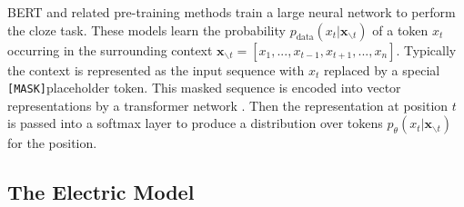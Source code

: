 \documentclass[11pt,a4paper]{article}
\newcommand{\kc}[1]{\textcolor{red}{KC: #1}}
\newcommand{\kc}[1]{}
\newcommand{\replace}[3] {
    \textsc{replace}(#1, #2, #3)
}
\newcommand{\aln}[1] {
	\begin{align} #1 \end{align}
}
\newcommand{\lossmle}{\mathcal{L}_{\text{MLE}}(\theta)}
\newcommand{\lossmlm}{\mathcal{L}_{\text{MLM}}(\theta)}
\newcommand{\I}{\bm{m}}
\newcommand{\bx}{\bm{x}}
\newcommand{\cntxt}{\bx_{\backslash t}}
\newcommand{\pdata}{p_\text{data}}
\newcommand{\E} {\mathop{\mathbb{E}}}
\newcommand{\mask}{\texttt{[MASK]}}
\begin{document}
BERT and related pre-training methods \cite{baevski2019cloze, liu2019roberta,  lan2019albert}
train a large neural network to perform the cloze task.
These models learn the probability $\pdata(x_t | \cntxt)$ of a token $x_t$ occurring in the surrounding context $\cntxt = [x_1, ..., x_{t- 1}, x_{t+1}, ..., x_n]$.
Typically the context is represented as %
the input sequence with $x_t$ replaced by a special \mask placeholder token. 
This masked sequence is encoded into vector representations by a transformer network \cite{Vaswani2017AttentionIA}.
Then the representation at position $t$ is passed into a softmax layer to produce a 
distribution over tokens $p_\theta(x_t | \cntxt)$ for the position.

\subsection{The Electric Model}
\end{document}
